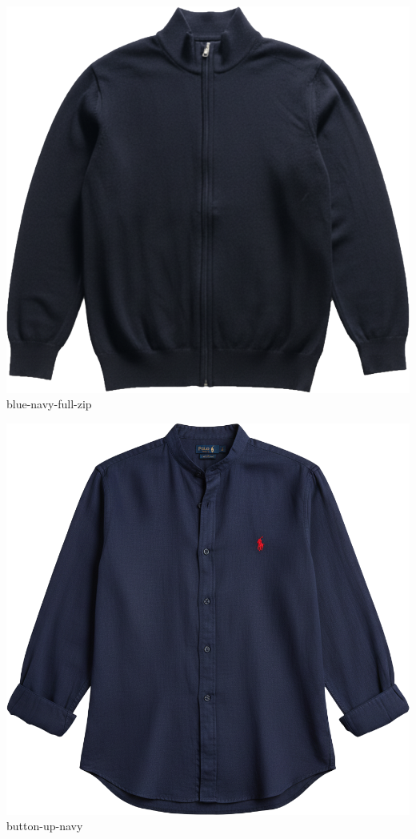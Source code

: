 \documentclass[10pt]{article}
\begin{document}
\
\vspace{2mm}\
\begin{minipage}[t]{0.22\textwidth}\centering\vspace{0mm}
\includegraphics[width=\linewidth,keepaspectratio]{assets/midlayer/blue-navy-full-zip.png}\\
\vspace{0.5mm}\tiny blue-navy-full-zip\end{minipage}
\begin{minipage}[t]{0.22\textwidth}\centering\vspace{0mm}
\includegraphics[width=\linewidth,keepaspectratio]{assets/midlayer/button-up-navy.png}\\
\vspace{0.5mm}\tiny button-up-navy\end{minipage}
\end{document}
